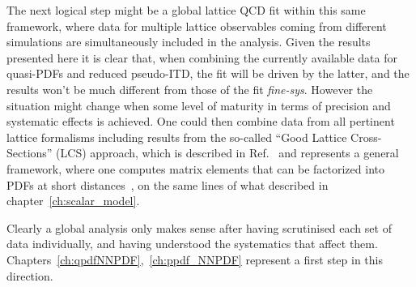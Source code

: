 %
The next logical step might be a global lattice QCD fit within this same framework, where data for multiple lattice observables 
coming from different simulations are simultaneously included in the analysis.
Given the results presented here it is clear that, when combining the currently available
data for quasi-PDFs and reduced pseudo-ITD, the fit will be driven by the latter, 
and the results won't be much different from those of the fit \textit{fine-sys}.
However the situation might change when 
some level of maturity in terms of precision and systematic effects is achieved.
One could then combine data from all pertinent lattice formalisms 
including results from the so-called “Good Lattice Cross-Sections” (LCS) approach, which is described in Ref.~\cite{Ma:2017pxb}
and represents a general framework, where one computes matrix elements that can be factorized into PDFs
at short distances~\cite{Bali:2017gfr,Bali:2018spj,Sufian:2019bol,Bali:2019ecy, Sufian:2020vzb}, on the same 
lines of what described in chapter~\ref{ch:scalar_model}.

Clearly a global analysis only makes sense after having scrutinised each set of data individually,
and having understood the systematics that affect them. Chapters~\ref{ch:qpdfNNPDF},~\ref{ch:ppdf_NNPDF} represent a 
first step in this direction.